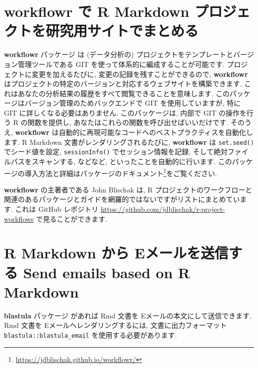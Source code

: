 \documentclass[
  11pt,
  lualatex,ja=standard,jafont=noto]{bxjsreport}
\renewcommand{\href}[2]{#2\footnote{\url{#1}}}
\begin{document}
\hypertarget{workflowr}{%
\section{\texorpdfstring{\textbf{workflowr} で R Markdown プロジェクトを研究用サイトでまとめる}{workflowr で R Markdown プロジェクトを研究用サイトでまとめる}}\label{workflowr}}

\textbf{workflowr} パッケージ \autocite{R-workflowr,workflowr2019}は (データ分析の) プロジェクトをテンプレートとバージョン管理ツールである GIT を使って体系的に編成することが可能です. プロジェクトに変更を加えるたびに, 変更の記録を残すことができるので, \textbf{workflowr} はプロジェクトの特定のバージョンと対応するウェブサイトを構築できます. これはあなたの分析結果の履歴をすべて閲覧できることを意味します. このパッケージはバージョン管理のためバックエンドで GIT を使用していますが, 特に GIT に詳しくなる必要はありません. このパッケージは, 内部で GIT の操作を行う R の関数を提供し, あなたはこれらの関数を呼び出せばいいだけです. そのうえ, \textbf{workflowr} は自動的に再現可能なコードへのベストプラクティスを自動化します. R Markdown 文書がレンダリングされるたびに, \textbf{workflowr} は \texttt{set.seed()} でシード値を設定, \texttt{sessionInfo()} でセッション情報を記録, そして絶対ファイルパスをスキャンする, などなど, といったことを自動的に行います. このパッケージの導入方法と詳細は\href{https://jdblischak.github.io/workflowr/}{パッケージのドキュメント}をご覧ください.

\textbf{workflowr} の主著者である John Blischak は, R プロジェクトのワークフローと関連のあるパッケージとガイドを網羅的ではないですがリストにまとめています. これは GitHub レポジトリ \url{https://github.com/jdblischak/r-project-workflows} で見ることができます.

\hypertarget{blastula-email}{%
\section{R Markdown から Eメールを送信する Send emails based on R Markdown}\label{blastula-email}}

\textbf{blastula} パッケージ \autocite{R-blastula}があれば Rmd 文書を Eメールの本文にして送信できます. Rmd 文書を Eメールへレンダリングするには, 文書に出力フォーマット \texttt{blastula::blastula\_email} を使用する必要があります.
\end{document}
